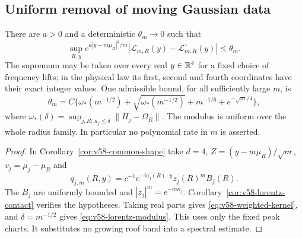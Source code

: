 \subsection{Uniform removal of moving Gaussian data}
\begin{theorem}
\label{thm:v58-common-transition}
There are $a>0$ and a deterministic $\theta_m\to0$ such that
\begin{equation}\label{eq:v58-weighted-kernel}
 \sup_{R,y}e^{a|y-m\mu_R|^2/m}
      |\mathcal L_{m,R}(y)-\mathcal L^\circ_{m,R}(y)|
                                         \le\theta_m.
\end{equation}
The supremum may be taken over every real $y\in\mathbb R^4$ for a fixed
choice of frequency lifts; in the physical law its first, second and
fourth coordinates have their exact integer values. One admissible
bound, for all sufficiently large $m$, is
\begin{equation}\label{eq:v58-lorentz-modulus}
 \theta_m=C\{\omega_*(m^{-1/2})+
        \sqrt{\omega_*(m^{-1/2})}+m^{-1/6}+e^{-\sqrt m/4}\},
\end{equation}
where
$\omega_*(\delta)=\sup_{j,R:\,\kappa_j\le\delta}\|H_j-\Omega_R\|$.
The modulus is uniform over the whole radius family. In particular
no polynomial rate in $m$ is asserted.
\end{theorem}
\begin{proof}
In Corollary~\ref{cor:v58-common-shape} take $d=4$,
$Z=(y-m\mu_R)/\sqrt m$, $v_j=\mu_j-\mu_R$ and
\[
 q_{j,m}(R,y)=c^{-1}e^{-ia_j(R)\cdot y}z_j(R)^mB_j(R).
\]
The $B_j$ are uniformly bounded and $|z_j|^m=e^{-m\kappa_j}$.
Corollary~\ref{cor:v58-lorentz-contact} verifies the hypotheses.
Taking real parts gives \eqref{eq:v58-weighted-kernel}, and
$\delta=m^{-1/2}$ gives \eqref{eq:v58-lorentz-modulus}.
This uses only the fixed peak charts. It substitutes no growing
roof band into a spectral estimate.
\end{proof}

